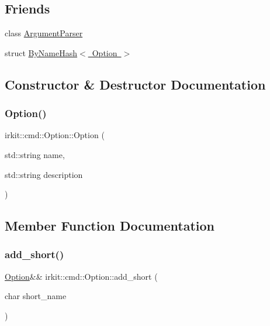 \subsection*{Friends}
\begin{DoxyCompactItemize}
\item 
class \mbox{\hyperlink{classirkit_1_1cmd_1_1Option_a55c9e1ac006a645af402e3aee6b64e00}{Argument\+Parser}}
\item 
struct \mbox{\hyperlink{classirkit_1_1cmd_1_1Option_a0066c7e9ad41107a46c66ace788ced49}{By\+Name\+Hash$<$ Option $>$}}
\end{DoxyCompactItemize}


\subsection{Constructor \& Destructor Documentation}
\mbox{\label{classirkit_1_1cmd_1_1Option_a3a0e2504511cf3b0d90005fae4389bb7}} 
\subsubsection{\texorpdfstring{Option()}{Option()}}
{\footnotesize\ttfamily irkit\+::cmd\+::\+Option\+::\+Option (\begin{DoxyParamCaption}\item[{std\+::string}]{name,  }\item[{std\+::string}]{description }\end{DoxyParamCaption})\hspace{0.3cm}{\ttfamily [inline]}}



\subsection{Member Function Documentation}
\mbox{\label{classirkit_1_1cmd_1_1Option_ab36042739a1cc45ebc85cd64ee69b560}} 
\subsubsection{\texorpdfstring{add\+\_\+short()}{add\_short()}}
{\footnotesize\ttfamily \mbox{\hyperlink{classirkit_1_1cmd_1_1Option}{Option}}\&\& irkit\+::cmd\+::\+Option\+::add\+\_\+short (\begin{DoxyParamCaption}\item[{char}]{short\+\_\+name }\end{DoxyParamCaption})\hspace{0.3cm}{\ttfamily [inline]}}

